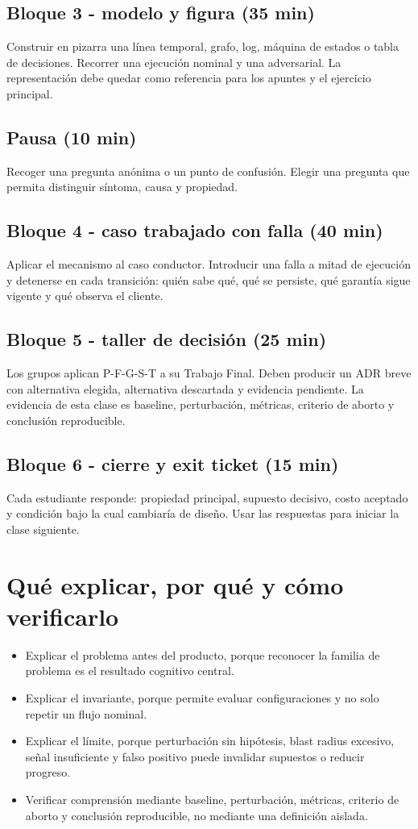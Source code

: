 \documentclass[variant=docente,cover=institutional,mode=screen]{ua-engineering-v6-article}
\begin{document}
\subsection*{Bloque 3 - modelo y figura (35 min)}
Construir en pizarra una línea temporal, grafo, log, máquina de estados o tabla de decisiones. Recorrer una ejecución nominal y una adversarial. La representación debe quedar como referencia para los apuntes y el ejercicio principal.

\subsection*{Pausa (10 min)}
Recoger una pregunta anónima o un punto de confusión. Elegir una pregunta que permita distinguir síntoma, causa y propiedad.

\subsection*{Bloque 4 - caso trabajado con falla (40 min)}
Aplicar el mecanismo al caso conductor. Introducir una falla a mitad de ejecución y detenerse en cada transición: quién sabe qué, qué se persiste, qué garantía sigue vigente y qué observa el cliente.

\subsection*{Bloque 5 - taller de decisión (25 min)}
Los grupos aplican P-F-G-S-T a su Trabajo Final. Deben producir un ADR breve con alternativa elegida, alternativa descartada y evidencia pendiente. La evidencia de esta clase es baseline, perturbación, métricas, criterio de aborto y conclusión reproducible.

\subsection*{Bloque 6 - cierre y exit ticket (15 min)}
Cada estudiante responde: propiedad principal, supuesto decisivo, costo aceptado y condición bajo la cual cambiaría de diseño. Usar las respuestas para iniciar la clase siguiente.

\section{Qué explicar, por qué y cómo verificarlo}
\begin{itemize}
\item Explicar el problema antes del producto, porque reconocer la familia de problema es el resultado cognitivo central.
\item Explicar el invariante, porque permite evaluar configuraciones y no solo repetir un flujo nominal.
\item Explicar el límite, porque perturbación sin hipótesis, blast radius excesivo, señal insuficiente y falso positivo puede invalidar supuestos o reducir progreso.
\item Verificar comprensión mediante baseline, perturbación, métricas, criterio de aborto y conclusión reproducible, no mediante una definición aislada.
\end{itemize}
\end{document}
